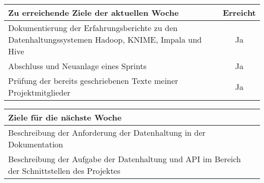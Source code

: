 \begin{tabularx}{\textwidth}{Xc}
    \arrayrulecolor{OliveGreen}
    \toprule
    {\bfseries Zu erreichende Ziele der aktuellen Woche} & {\bfseries Erreicht} \\
    \midrule[2pt]
    Dokumentierung der Erfahrungsberichte zu den Datenhaltungssystemen Hadoop,
    KNIME, Impala und Hive  &  Ja  \\
    \rowcolor{OliveGreen!15}
    Abschluss und Neuanlage eines Sprints  &  Ja  \\
    \rowcolor{White}
    Prüfung der bereits geschriebenen Texte meiner Projektmitglieder  &  Ja  \\
    \bottomrule[2pt]
\end{tabularx}
%
\vspace{1cm}
%
\begin{tabularx}{\textwidth}{Xc}
    \arrayrulecolor{OliveGreen}
    \toprule
    {\bfseries Ziele für die nächste Woche}              &                      \\
    \midrule[2pt]
    Beschreibung der Anforderung der Datenhaltung in der Dokumentation  \\
    \rowcolor{OliveGreen!15}
    Beschreibung der Aufgabe der Datenhaltung und API im Bereich der 
    Schnittstellen des Projektes  \\
\end{tabularx}
